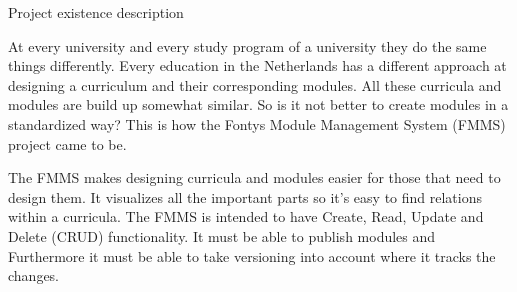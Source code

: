 Project existence description

At every university and every study program of a university they do the same things differently. 
Every education in the Netherlands has a different approach at designing a curriculum and their corresponding modules.
All these curricula and modules are build up somewhat similar. So is it not better to create modules in a standardized way?
This is how the Fontys Module Management System (FMMS) project came to be.

The FMMS makes designing curricula and modules easier for those that need to design them. It visualizes all the important parts so it's easy to find relations within a curricula. The FMMS is intended to have Create, Read, Update and Delete (CRUD) functionality. It must be able to publish modules and Furthermore it must be able to take versioning into account where it tracks the changes.